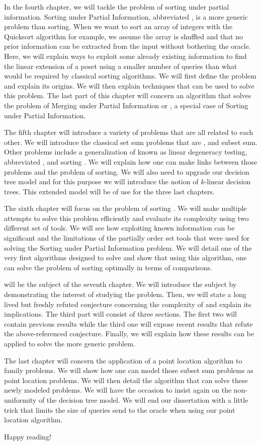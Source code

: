 In the fourth chapter, we will tackle the problem of sorting under partial
information. Sorting under Partial Information, abbreviated , is
a more generic problem than sorting. When we want to sort an array of integers
with the Quicksort algorithm for example, we assume the array is shuffled and
that no prior information can be extracted from the input without bothering the
oracle. Here, we will explain ways to exploit some already existing information
to find the linear extension of a poset using a smaller number of queries than
what would be required by classical sorting algorithms. We will first define
the problem and explain its origins. We will then explain techniques that can
be used to solve this problem. The last part of this chapter will concern an
algorithm that solves the problem of Merging under Partial Information or
, a special case of Sorting under Partial Information.

The fifth chapter will introduce a variety of problems that are all related to
each other. We will introduce the classical set sum problems that are
\threeSUM, \kSUM and subset sum. Other problems include a generalization of
\kSUM known as linear degeneracy testing, abbreviated \kLDT, and sorting \XY.
We will explain how one can make links between those problems and the problem
of sorting. We will also need to upgrade our decision tree model and for this
purpose we will introduce the notion of \(k\)-linear decision trees. This
extended model will be of use for the three last chapters.

The sixth chapter will focus on the problem of sorting \XY. We will make
multiple attempts to solve this problem efficiently and evaluate its complexity
using two different set of tools. We will see how exploiting known information
can be significant and the limitations of the partially order set tools that
were used for solving the Sorting under Partial Information problem. We will
detail one of the very first algorithms designed to solve  and
show that using this algorithm, one can solve the problem of sorting \XY
optimally in terms of comparisons.

\threeSUM will be the subject of the seventh chapter. We will introduce the
subject by demonstrating the interest of studying the \threeSUM problem. Then,
we will state a long lived but freshly refuted conjecture concerning the
complexity of \threeSUM and explain its implications. The third part will
consist of three sections. The first two will contain previous results while
the third one will expose recent results that refute the above-referenced
conjecture. Finally, we will explain how these results can be applied to solve
the more generic \kLDT problem.

The last chapter will concern the application of a point location algorithm to
\kSUM family problems. We will show how one can model those subset sum
problems as point location problems. We will then detail the algorithm that
can solve these newly modeled problems. We will have the occasion to insist again
on the non-uniformity of the decision tree model. We will end our dissertation
with a little trick that limits the size of queries send to the oracle when
using our point location algorithm.

Happy reading!
